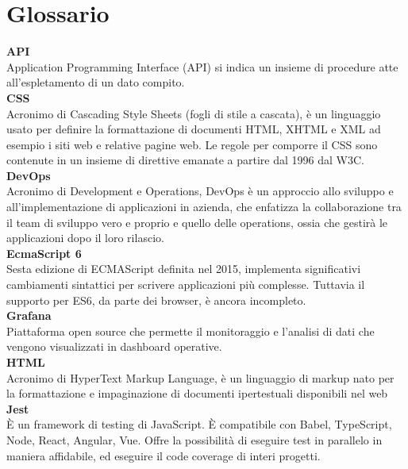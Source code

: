 \section{Glossario}\label{glox}

\textbf{API}\-\\
Application Programming Interface (API) si indica un insieme di procedure atte all'espletamento di un dato compito.
\-\\

\textbf{CSS}\-\\
Acronimo di Cascading Style Sheets (fogli di stile a cascata), è un linguaggio usato per definire la formattazione di documenti HTML, XHTML e XML ad esempio i siti web e relative pagine web. Le regole per comporre il CSS sono contenute in un insieme di direttive emanate a partire dal 1996 dal W3C. 
\-\\

\textbf{DevOps}\-\\
Acronimo di Development e Operations, DevOps è un approccio allo sviluppo e all'implementazione di applicazioni in azienda, che enfatizza la collaborazione tra il team di sviluppo vero e proprio e quello delle operations, ossia che gestirà le applicazioni dopo il loro rilascio.
\-\\

\textbf{EcmaScript 6}\-\\
Sesta edizione di ECMAScript definita nel 2015, implementa significativi cambiamenti sintattici per scrivere applicazioni più complesse. Tuttavia il supporto per ES6, da parte dei browser, è ancora incompleto.
\-\\

\textbf{Grafana}\-\\
Piattaforma open source che permette il monitoraggio e l'analisi di dati che vengono visualizzati in dashboard operative.
\-\\

\textbf{HTML}\-\\
Acronimo di HyperText Markup Language, è un linguaggio di markup nato per la formattazione e impaginazione di documenti ipertestuali disponibili nel web
\-\\

\textbf{Jest}\-\\
È un framework di testing di JavaScript. È compatibile con Babel, TypeScript, Node, React, Angular, Vue. Offre la possibilità di eseguire test in parallelo in maniera affidabile, ed eseguire il code coverage di interi progetti.
\-\\

